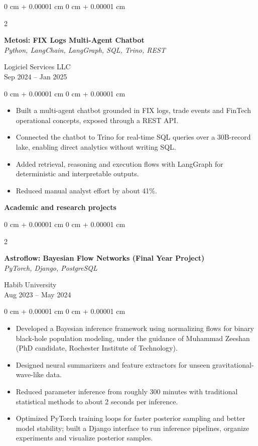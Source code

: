 \documentclass[10pt, letterpaper]{article}
\newenvironment{highlights}{
    \begin{itemize}[
        topsep=0.10 cm,
        parsep=0.10 cm,
        partopsep=0pt,
        itemsep=0pt,
        leftmargin=0 cm + 10pt
    ]
}{
    \end{itemize}
} %
\newenvironment{onecolentry}{
    \begin{adjustwidth}{
        0 cm + 0.00001 cm
    }{
        0 cm + 0.00001 cm
    }
}{
    \end{adjustwidth}
} %
\newenvironment{twocolentry}[2][]{
    \onecolentry
    \def\secondColumn{#2}
    \setcolumnwidth{\fill, 4.5 cm}
    \begin{paracol}{2}
}{
    \switchcolumn \raggedleft \secondColumn
    \end{paracol}
    \endonecolentry
} %
\begin{document}
\vspace{0.2 cm}

\begin{twocolentry}{Logiciel Services LLC \\ Sep 2024 -- Jan 2025}
    \textbf{Metosi: FIX Logs Multi-Agent Chatbot} \\
    \textit{Python, LangChain, LangGraph, SQL, Trino, REST}
\end{twocolentry}
\begin{onecolentry}
    \begin{highlights}
        \item Built a multi-agent chatbot grounded in FIX logs, trade events and FinTech operational concepts, exposed through a REST API.
        \item Connected the chatbot to Trino for real-time SQL queries over a 30B-record lake, enabling direct analytics without writing SQL.
        \item Added retrieval, reasoning and execution flows with LangGraph for deterministic and interpretable outputs.
        \item Reduced manual analyst effort by about 41\%.
    \end{highlights}
\end{onecolentry}

\vspace{0.3 cm}

\textbf{Academic and research projects}

\vspace{0.15 cm}

\begin{twocolentry}{Habib University \\ Aug 2023 -- May 2024}
    \textbf{Astroflow: Bayesian Flow Networks (Final Year Project)} \\
    \textit{PyTorch, Django, PostgreSQL}
\end{twocolentry}
\begin{onecolentry}
    \begin{highlights}
        \item Developed a Bayesian inference framework using normalizing flows for binary black-hole population modeling, under the guidance of Muhammad Zeeshan (PhD candidate, Rochester Institute of Technology).
        \item Designed neural summarizers and feature extractors for unseen gravitational-wave-like data.
        \item Reduced parameter inference from roughly 300 minutes with traditional statistical methods to about 2 seconds per inference.
        \item Optimized PyTorch training loops for faster posterior sampling and better model stability; built a Django interface to run inference pipelines, organize experiments and visualize posterior samples.
    \end{highlights}
\end{onecolentry}
\end{document}
